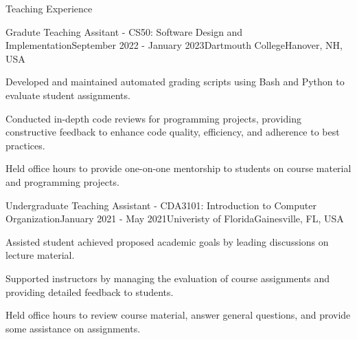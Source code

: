 \documentclass{resume} %
\begin{document}
\begin{rSection}{Teaching Experience}
\begin{rSubsection}{Gradute Teaching Assitant - CS50: Software Design and Implementation}{September 2022 - January 2023}{Dartmouth College}{Hanover, NH, USA}
  \item Developed and maintained automated grading scripts using Bash and Python to evaluate student assignments.
  \item Conducted in-depth code reviews for programming projects, providing constructive feedback to enhance code quality, efficiency, and adherence to best practices.
  \item Held office hours to provide one-on-one mentorship to students on course material and programming projects.
\end{rSubsection}
\begin{rSubsection}{Undergraduate Teaching Assistant - CDA3101: Introduction to Computer Organization}{January 2021 - May 2021}{Univeristy of Florida}{Gainesville, FL, USA}
\item Assisted student achieved proposed academic goals by leading discussions on lecture material. 
\item Supported instructors by managing the evaluation of course assignments and providing detailed feedback to students.
\item Held office hours to review course material, answer general questions, and provide some assistance on assignments.
\end{rSubsection}
\end{rSection}
\end{document}
